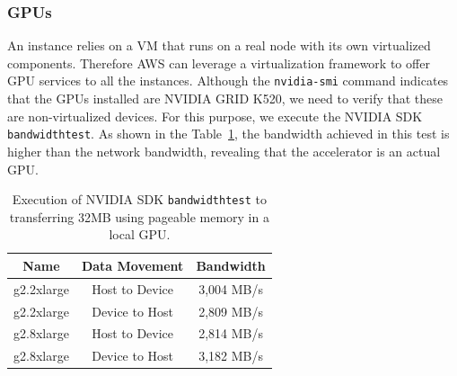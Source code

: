 \documentclass[a4paper,twoside]{article}
\begin{document}
\subsubsection{GPUs}
An instance relies on a VM that runs on a real node with its own virtualized components. 
Therefore AWS can leverage a virtualization framework to offer GPU services to all the instances.
Although the {\tt nvidia-smi} command indicates that the GPUs installed are NVIDIA GRID K520, 
we need to verify that these are non-virtualized devices. For this purpose, we execute the NVIDIA SDK {\tt bandwidthtest}. 
As shown in the Table~\ref{table:bwt}, the bandwidth achieved in this test is higher than the network bandwidth, revealing that the accelerator is an actual GPU. 

\begin{table}[htb]
\renewcommand{\arraystretch}{1.3}
\caption{Execution of NVIDIA SDK {\tt bandwidthtest} to transferring 32MB using pageable memory in a local GPU.}
\label{table:bwt}
\tabcolsep=0.09cm
\begin{center}\begin{tabular}{ccc}
Name &  Data Movement & Bandwidth \\ \hline \hline
g2.2xlarge & Host to Device & 3,004 MB/s \\ \hline
g2.2xlarge & Device to Host & 2,809 MB/s\\ \hline
g2.8xlarge & Host to Device & 2,814 MB/s\\ \hline
g2.8xlarge & Device to Host & 3,182 MB/s\\ \hline
\end{tabular}\end{center}\end{table}
\end{document}
